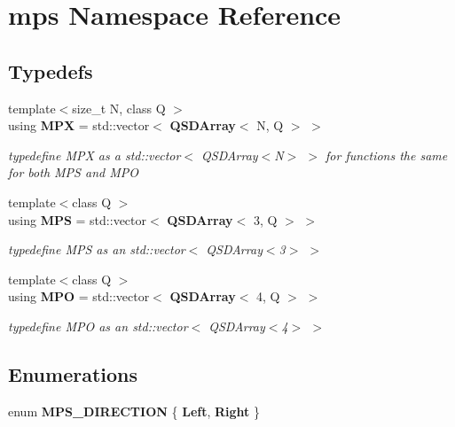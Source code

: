 \section{mps Namespace Reference}
\label{d1/d7b/namespacemps}
\subsection*{Typedefs}
\begin{DoxyCompactItemize}
\item 
{\footnotesize template$<$size\-\_\-t N, class Q $>$ }\\using {\bf M\-P\-X} = std\-::vector$<$ {\bf Q\-S\-D\-Array}$<$ N, Q $>$ $>$
\begin{DoxyCompactList}\small\item\em typedefine M\-P\-X as a std\-::vector$<$ Q\-S\-D\-Array$<$\-N$>$ $>$ for functions the same for both M\-P\-S and M\-P\-O \end{DoxyCompactList}\item 
{\footnotesize template$<$class Q $>$ }\\using {\bf M\-P\-S} = std\-::vector$<$ {\bf Q\-S\-D\-Array}$<$ 3, Q $>$ $>$
\begin{DoxyCompactList}\small\item\em typedefine M\-P\-S as an std\-::vector$<$ Q\-S\-D\-Array$<$3$>$ $>$ \end{DoxyCompactList}\item 
{\footnotesize template$<$class Q $>$ }\\using {\bf M\-P\-O} = std\-::vector$<$ {\bf Q\-S\-D\-Array}$<$ 4, Q $>$ $>$
\begin{DoxyCompactList}\small\item\em typedefine M\-P\-O as an std\-::vector$<$ Q\-S\-D\-Array$<$4$>$ $>$ \end{DoxyCompactList}\end{DoxyCompactItemize}
\subsection*{Enumerations}
\begin{DoxyCompactItemize}
\item 
enum {\bf M\-P\-S\-\_\-\-D\-I\-R\-E\-C\-T\-I\-O\-N} \{ {\bf Left}, 
{\bf Right}
 \}
\end{DoxyCompactItemize}
